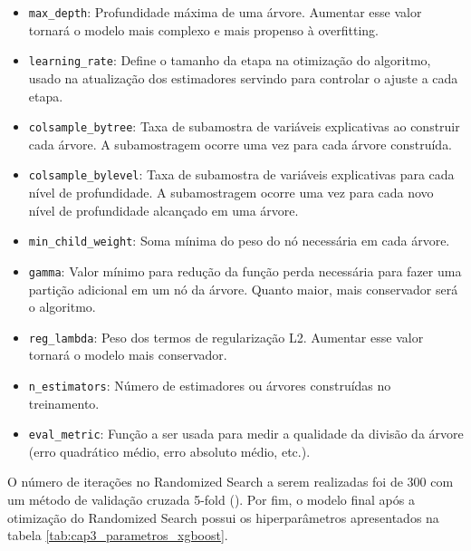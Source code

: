 \begin{itemize}
	\item \verb|max_depth|: Profundidade máxima de uma árvore. Aumentar esse valor tornará o modelo mais complexo e mais propenso à overfitting.
	\item \verb|learning_rate|: Define o tamanho da etapa na otimização do algoritmo, usado na atualização dos estimadores servindo para controlar o ajuste a cada etapa.
	\item \verb|colsample_bytree|: Taxa de subamostra de variáveis explicativas ao construir cada árvore. A subamostragem ocorre uma vez para cada árvore construída.
	\item \verb|colsample_bylevel|: Taxa de subamostra de variáveis explicativas para cada nível de profundidade. A subamostragem ocorre uma vez para cada novo nível de profundidade alcançado em uma árvore.
	\item \verb|min_child_weight|: Soma mínima do peso do nó necessária em cada árvore.
	\item \verb|gamma|: Valor mínimo para redução da função perda necessária para fazer uma partição adicional em um nó da árvore. Quanto maior, mais conservador será o algoritmo.
	\item \verb|reg_lambda|: Peso dos termos de regularização L2. Aumentar esse valor tornará o modelo mais conservador.
	\item \verb|n_estimators|: Número de estimadores ou árvores construídas no treinamento.
	\item \verb|eval_metric|: Função a ser usada para medir a qualidade da divisão da árvore (erro quadrático médio, erro absoluto médio, etc.).
\end{itemize}

O número de iterações no Randomized Search a serem realizadas foi de 300 com um método de validação cruzada 5-fold (\citet{Kohavi1995}). Por fim, o modelo final após a otimização do Randomized Search possui os hiperparâmetros apresentados na tabela \ref{tab:cap3_parametros_xgboost}.


